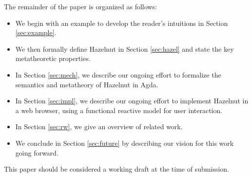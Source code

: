 The remainder of the paper is organized as follows:
\begin{itemize}
  \item We begin with an example to develop the reader's intuitions in Section
    \ref{sec:example}.

  \item We then formally define Hazelnut in Section \ref{sec:hazel} and state the key metatheoretic properties.

  \item In Section \ref{sec:mech}, we describe our ongoing effort to formalize the semantics and metatheory of Hazelnut in Agda.

  \item In Section \ref{sec:impl}, we describe our ongoing effort to implement Hazelnut in a web browser, using a functional reactive model for user interaction.
  \item In Section \ref{sec:rw}, we give an overview of related work.
  \item We conclude in Section \ref{sec:future} by describing our vision for this work going 
    forward.
\end{itemize}

This paper should be considered a working draft at the time of submission.
